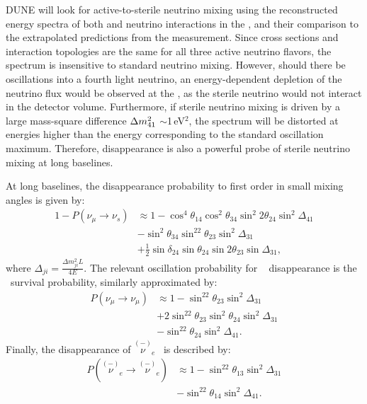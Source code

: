 DUNE will look for active-to-sterile neutrino mixing using the reconstructed energy spectra of both   and   neutrino interactions  in the , and their comparison to the extrapolated predictions from the  measurement. Since  cross sections and interaction topologies are the same for all three active neutrino flavors, the  spectrum is insensitive to standard neutrino mixing. However, should there be oscillations into a fourth light neutrino, an energy-dependent depletion of the neutrino flux would be observed at the , as the sterile neutrino would not interact in the detector volume. Furthermore, if sterile neutrino mixing is driven by a large mass-square difference $\Delta m^2_{\rm{41}}$ $\sim$1\,eV$^{2}$, the  spectrum will be distorted at energies higher than the energy corresponding to the standard oscillation maximum. Therefore,  disappearance is also a powerful probe of sterile neutrino mixing at long baselines. 

At long baselines, the  disappearance probability to first order in small mixing angles is given by:
\begin{equation}
\begin{aligned}
1 - P(\nu_{\mu} \rightarrow \nu_s) & \approx 1 - \cos^4\theta_{14}\cos^2\theta_{34}\sin^{2}2\theta_{24}\sin^2\Delta_{41} \\
& - \sin^2\theta_{34}\sin^22\theta_{23}\sin^2\Delta_{31} \\
& + \frac{1}{2}\sin\delta_{24}\sin\theta_{24}\sin2\theta_{23}\sin\Delta_{31},
\end{aligned}
\end{equation}
where $\Delta_{ji} = \frac{\Delta m^2_{ji}L}{4E}$. 
The relevant oscillation probability for \numu~ disappearance is the \numu~survival probability, similarly approximated by:
\begin{equation}
\begin{aligned}
P(\nu_{\mu} \rightarrow \nu_{\mu}) &\approx 1 - \sin^22\theta_{23}\sin^2\Delta_{31} \\
& + 2\sin^22\theta_{23}\sin^2\theta_{24}\sin^2\Delta_{31} \\ 
& - \sin^22\theta_{24}\sin^2\Delta_{41}.
\label{eq:NuMuDisFull}
\end{aligned}
\end{equation}
Finally, the disappearance of $\overset{(-)}\nu\!\!_e$~ is described by: 
\begin{equation}
\begin{aligned}
P(\overset{(-)}\nu\!\!_e \rightarrow \overset{(-)}\nu\!\!_e) &\approx 1 - \sin^22\theta_{13}\sin^2\Delta_{31} \\
& - \sin^22\theta_{14}\sin^2\Delta_{41}.
\label{eq:NueDisFull}
\end{aligned}
\end{equation}


